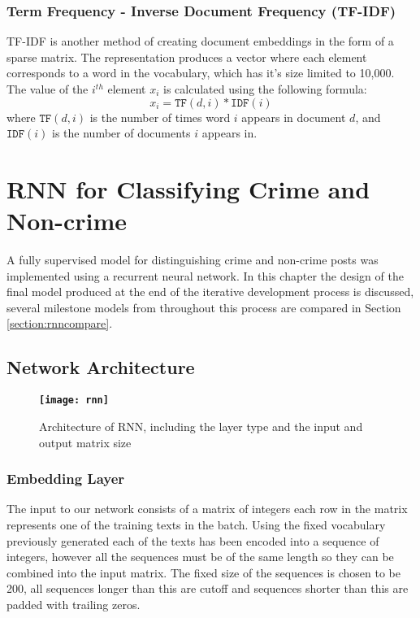 \documentclass[12pt,a4paper,twoside,openright]{report}
\begin{document}
\subsubsection{Term Frequency - Inverse Document Frequency (TF-IDF)}
TF-IDF is another method of creating document embeddings in the form of a sparse matrix. The representation produces a vector where each element corresponds to a word in the vocabulary, which has it's size limited to 10,000. The value of the $i^{th}$ element $x_i$ is calculated using the following formula:
\begin{equation}
    x_i = \texttt{TF}(d, i) * \texttt{IDF}(i)
\end{equation}
where $\texttt{TF}(d, i)$ is the number of times word $i$ appears in document $d$, and $\texttt{IDF}(i)$ is the number of documents $i$ appears in. 

\section{RNN for Classifying Crime and Non-crime}
\label{section:cnc}
\label{section:rnni}
A fully supervised model for distinguishing crime and non-crime posts was implemented using a recurrent neural network. In this chapter the design of the final model produced at the end of the iterative development process is discussed, several milestone models from throughout this process are compared in Section \ref{section:rnncompare}.

\subsection{Network Architecture}
\begin{figure}[h]
    \centering
    \begin{minipage}{1\textwidth}
        \centering\textbf{
        \texttt{[image: rnn]}}
        \caption{Architecture of RNN, including the layer type and the input and output matrix size}\label{Fig:Data1}
        \label{fig:slam}
    \end{minipage}\hfill
\end{figure}
 
\subsubsection{Embedding Layer}
The input to our network consists of a matrix of integers each row in the matrix represents one of the training texts in the batch. Using the fixed vocabulary previously generated each of the texts has been encoded into a sequence of integers, however all the sequences must be of the same length so they can be combined into the input matrix. The fixed size of the sequences is chosen to be 200, all sequences longer than this are cutoff and sequences shorter than this are padded with trailing zeros. 
\newline
 
\end{document}
